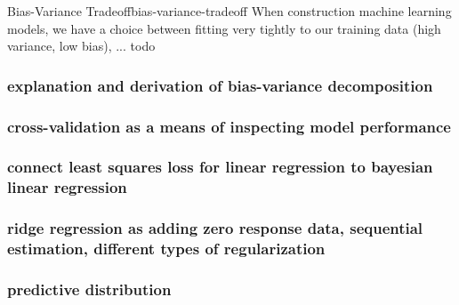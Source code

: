 \begin{definition}{Bias-Variance Tradeoff}{bias-variance-tradeoff}
    When construction machine learning models, we have a choice between fitting very tightly to our training data (high variance, low bias), ... todo
\end{definition}



\subsubsection{explanation and derivation of bias-variance decomposition}
\subsubsection{cross-validation as a means of inspecting model performance}
\subsubsection{connect least squares loss for linear regression to bayesian linear regression}
\subsubsection{ridge regression as adding zero response data, sequential estimation, different types of regularization}
\subsubsection{predictive distribution}